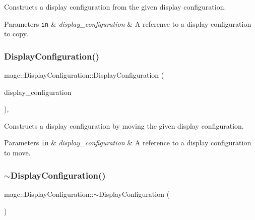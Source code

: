 Constructs a display configuration from the given display configuration.


\begin{DoxyParams}[1]{Parameters}
\mbox{\tt in}  & {\em display\+\_\+configuration} & A reference to a display configuration to copy. \\
\hline
\end{DoxyParams}
\hypertarget{structmage_1_1_display_configuration_a3b84ef28c7dc538a4b55c3b86bbcfb1b}{}\label{structmage_1_1_display_configuration_a3b84ef28c7dc538a4b55c3b86bbcfb1b} 
\subsubsection{\texorpdfstring{Display\+Configuration()}{DisplayConfiguration()}\hspace{0.1cm}{\footnotesize\ttfamily [3/3]}}
{\footnotesize\ttfamily mage\+::\+Display\+Configuration\+::\+Display\+Configuration (\begin{DoxyParamCaption}\item[{\hyperlink{structmage_1_1_display_configuration}{Display\+Configuration} \&\&}]{display\+\_\+configuration }\end{DoxyParamCaption})\hspace{0.3cm}{\ttfamily [default]}, {\ttfamily [noexcept]}}

Constructs a display configuration by moving the given display configuration.


\begin{DoxyParams}[1]{Parameters}
\mbox{\tt in}  & {\em display\+\_\+configuration} & A reference to a display configuration to move. \\
\hline
\end{DoxyParams}
\hypertarget{structmage_1_1_display_configuration_a91cdf4f2015177e41290238d96a55328}{}\label{structmage_1_1_display_configuration_a91cdf4f2015177e41290238d96a55328} 
\subsubsection{\texorpdfstring{$\sim$\+Display\+Configuration()}{~DisplayConfiguration()}}
{\footnotesize\ttfamily mage\+::\+Display\+Configuration\+::$\sim$\+Display\+Configuration (\begin{DoxyParamCaption}{ }\end{DoxyParamCaption})\hspace{0.3cm}{\ttfamily [default]}}

